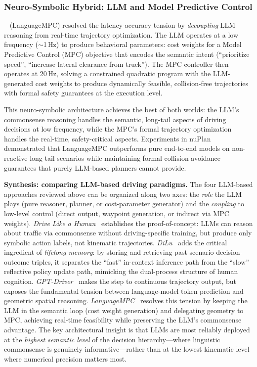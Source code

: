 \documentclass[12pt, a4paper]{article}
\begin{document}
\subsubsection{Neuro-Symbolic Hybrid: LLM and Model Predictive Control}

\citeauthor{sha2023languagempc}~\cite{sha2023languagempc} (LanguageMPC)
resolved the latency-accuracy tension by \emph{decoupling} LLM reasoning
from real-time trajectory optimization.  The LLM operates at a low frequency
($\sim$1\,Hz) to produce behavioral parameters: cost weights for a
Model Predictive Control (MPC) objective that encodes the semantic intent
(``prioritize speed'', ``increase lateral clearance from truck'').  The
MPC controller then operates at 20\,Hz, solving a constrained quadratic
program with the LLM-generated cost weights to produce dynamically feasible,
collision-free trajectories with formal safety guarantees at the execution level.

This neuro-symbolic architecture achieves the best of both worlds: the LLM's
commonsense reasoning handles the semantic, long-tail aspects of driving
decisions at low frequency, while the MPC's formal trajectory optimization
handles the real-time, safety-critical aspects.  Experiments in nuPlan
demonstrated that LanguageMPC outperforms pure end-to-end models on
non-reactive long-tail scenarios while maintaining formal collision-avoidance
guarantees that purely LLM-based planners cannot provide.

\smallskip\noindent\textbf{Synthesis: comparing LLM-based driving paradigms.}
The four LLM-based approaches reviewed above can be organized along two
axes: the \emph{role} the LLM plays (pure reasoner, planner, or cost-parameter
generator) and the \emph{coupling} to low-level control (direct output,
waypoint generation, or indirect via MPC weights).
\emph{Drive Like a Human}~\cite{fu2023drive} establishes the proof-of-concept:
LLMs can reason about traffic via commonsense without driving-specific training,
but produce only symbolic action labels, not kinematic trajectories.
\emph{DiLu}~\cite{wen2023dilu} adds the critical ingredient of \emph{lifelong
memory}: by storing and retrieving past scenario-decision-outcome triples,
it separates the ``fast'' in-context inference path from the ``slow'' reflective
policy update path, mimicking the dual-process structure of human cognition.
\emph{GPT-Driver}~\cite{mao2023gpt} makes the step to continuous trajectory
output, but exposes the fundamental tension between language-model token
prediction and geometric spatial reasoning.
\emph{LanguageMPC}~\cite{sha2023languagempc} resolves this tension by
keeping the LLM in the semantic loop (cost weight generation) and delegating
geometry to MPC, achieving real-time feasibility while preserving the LLM's
commonsense advantage.
The key architectural insight is that LLMs are most reliably deployed at the
\emph{highest semantic level} of the decision hierarchy---where linguistic
commonsense is genuinely informative---rather than at the
lowest kinematic level where numerical precision matters most.
\end{document}
